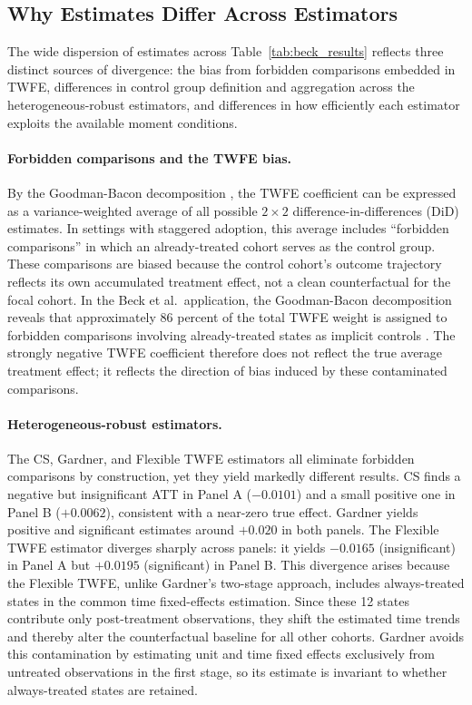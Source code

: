 
\subsection{Why Estimates Differ Across Estimators}
\label{subsec:why_differ}

The wide dispersion of estimates across Table~\ref{tab:beck_results}
reflects three distinct sources of divergence: the bias from forbidden
comparisons embedded in TWFE, differences in control group definition and
aggregation across the heterogeneous-robust estimators, and differences
in how efficiently each estimator exploits the available moment conditions.

\paragraph{Forbidden comparisons and the TWFE bias.}
By the Goodman-Bacon decomposition \citep{goodman-bacon2021}, the TWFE
coefficient can be expressed as a variance-weighted average of all
possible $2\times 2$ difference-in-differences (DiD) estimates. In settings
with staggered adoption, this average includes ``forbidden comparisons''
in which an already-treated cohort serves as the control group. These
comparisons are biased because the control cohort's outcome trajectory
reflects its own accumulated treatment effect, not a clean counterfactual
for the focal cohort. In the Beck et al.\ application, the
Goodman-Bacon decomposition reveals that approximately 86 percent of the
total TWFE weight is assigned to forbidden comparisons involving
already-treated states as implicit controls \citep{arora2025}. The
strongly negative TWFE coefficient therefore does not reflect the true
average treatment effect; it reflects the direction of bias induced by
these contaminated comparisons.

\paragraph{Heterogeneous-robust estimators.}
The CS, Gardner, and Flexible TWFE estimators all eliminate forbidden
comparisons by construction, yet they yield markedly different results.
CS finds a negative but insignificant ATT in Panel A ($-0.0101$) and a
small positive one in Panel B ($+0.0062$), consistent with a near-zero
true effect. Gardner yields positive and significant estimates around
$+0.020$ in both panels. The Flexible TWFE estimator diverges sharply
across panels: it yields $-0.0165$ (insignificant) in Panel A but
$+0.0195$ (significant) in Panel B. This divergence arises because
the Flexible TWFE, unlike Gardner's two-stage approach, includes
always-treated states in the common time fixed-effects estimation.
Since these 12 states contribute only post-treatment observations,
they shift the estimated time trends and thereby alter the
counterfactual baseline for all other cohorts. Gardner avoids this
contamination by estimating unit and time fixed effects exclusively
from untreated observations in the first stage, so its estimate is
invariant to whether always-treated states are retained.

